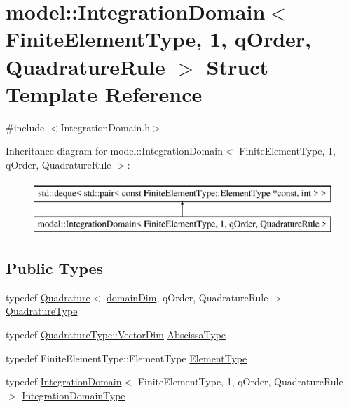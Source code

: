 \hypertarget{structmodel_1_1_integration_domain_3_01_finite_element_type_00_011_00_01q_order_00_01_quadrature_rule_01_4}{}\section{model\+:\+:Integration\+Domain$<$ Finite\+Element\+Type, 1, q\+Order, Quadrature\+Rule $>$ Struct Template Reference}
\label{structmodel_1_1_integration_domain_3_01_finite_element_type_00_011_00_01q_order_00_01_quadrature_rule_01_4}


{\ttfamily \#include $<$Integration\+Domain.\+h$>$}

Inheritance diagram for model\+:\+:Integration\+Domain$<$ Finite\+Element\+Type, 1, q\+Order, Quadrature\+Rule $>$\+:\begin{figure}[H]
\begin{center}
\leavevmode
\includegraphics[height=2.000000cm]{structmodel_1_1_integration_domain_3_01_finite_element_type_00_011_00_01q_order_00_01_quadrature_rule_01_4}
\end{center}
\end{figure}
\subsection*{Public Types}
\begin{DoxyCompactItemize}
\item 
typedef \hyperlink{structmodel_1_1_quadrature}{Quadrature}$<$ \hyperlink{structmodel_1_1_integration_domain_3_01_finite_element_type_00_011_00_01q_order_00_01_quadrature_rule_01_4_a4794e96f792f2344e4ac5842f50f3fa3}{domain\+Dim}, q\+Order, Quadrature\+Rule $>$ \hyperlink{structmodel_1_1_integration_domain_3_01_finite_element_type_00_011_00_01q_order_00_01_quadrature_rule_01_4_a057154318f491aae67780b638d79e0b6}{Quadrature\+Type}
\item 
typedef \hyperlink{structmodel_1_1_quadrature_af457aed3f503be1010dee155c33f7ec1}{Quadrature\+Type\+::\+Vector\+Dim} \hyperlink{structmodel_1_1_integration_domain_3_01_finite_element_type_00_011_00_01q_order_00_01_quadrature_rule_01_4_a7e1987441ecbe7f224f67657f97d115e}{Abscissa\+Type}
\item 
typedef Finite\+Element\+Type\+::\+Element\+Type \hyperlink{structmodel_1_1_integration_domain_3_01_finite_element_type_00_011_00_01q_order_00_01_quadrature_rule_01_4_a0c38472ef1c1f37f1c32e49a5cdc2f71}{Element\+Type}
\item 
typedef \hyperlink{structmodel_1_1_integration_domain}{Integration\+Domain}$<$ Finite\+Element\+Type, 1, q\+Order, Quadrature\+Rule $>$ \hyperlink{structmodel_1_1_integration_domain_3_01_finite_element_type_00_011_00_01q_order_00_01_quadrature_rule_01_4_a7873d1cffeaa8a8dde260fefa1827dbd}{Integration\+Domain\+Type}
\end{DoxyCompactItemize}
